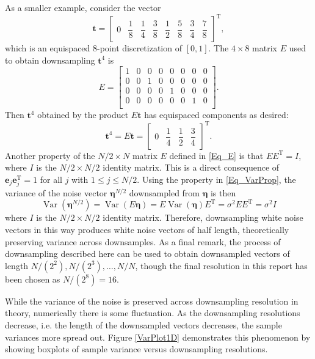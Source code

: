 \documentclass[12pt]{article}
\newcommand{\tdis}{\mathbf{t}}
\newcommand{\trans}{\mathrm{T}}	%
\newcommand{\noiseSD}{\sigma}	%
\newcommand{\noise}{\bm{\eta}}	%
\newcommand{\Var}{\operatorname{Var}}	%
\begin{document}
As a smaller example, consider the vector
\[\tdis = \begin{bmatrix}
0 & \dfrac{1}{8} & \dfrac{1}{4} & \dfrac{3}{8} & \dfrac{1}{2} & \dfrac{5}{8} & \dfrac{3}{4} & \dfrac{7}{8}
\end{bmatrix}^{\trans},\]
which is an equispaced 8-point discretization of $[0,1]$. The $4 \times 8$ matrix $E$ used to obtain downsampling $\tdis^{4}$ is
\[E = \begin{bmatrix}
1 & 0 & 0 & 0 & 0 & 0 & 0 & 0 \\
0 & 0 & 1 & 0 & 0 & 0 & 0 & 0 \\
0 & 0 & 0 & 0 & 1 & 0 & 0 & 0 \\
0 & 0 & 0 & 0 & 0 & 0 & 1 & 0 \\
\end{bmatrix}.\]
Then $\tdis^4$ obtained by the product $E\tdis$ has equispaced components as desired:
\[\tdis^4 = E\tdis = \begin{bmatrix}
0 & \dfrac{1}{4} & \dfrac{1}{2} & \dfrac{3}{4}
\end{bmatrix}^{\trans}.\]
\indent Another property of the $N/2 \times N$ matrix $E$ defined in \eqref{Eq_E} is that $EE^{\trans} = I$, where $I$ is the $N/2 \times N/2$ identity matrix.  This is a direct consequence of $\mathbf{e}_j\mathbf{e}_j^\trans = 1$ for all $j$ with $1 \leq j \leq N/2$. Using the property in \eqref{Eq_VarProp}, the variance of the  noise vector $\noise^{N/2}$ downsampled from $\noise$ is then
\[\Var(\noise^{N/2}) = \Var(E\noise) = E\Var(\noise)E^{\trans} = \noiseSD^2EE^{\trans} = \noiseSD^2I\]
where $I$ is the $N/2 \times N/2$ identity matrix. Therefore, downsampling white noise vectors in this way produces white noise vectors of half length, theoretically preserving variance across downsamples. As a final remark, the process of downsampling described here can be used to obtain downsampled vectors of length $N/(2^2), N/(2^3), \ldots, N/N$, though the final resolution in this report has been chosen as $N/(2^8) = 16$. \par 
While the variance of the noise is preserved across downsampling resolution in theory, numerically there is some fluctuation. As the downsampling resolutions decrease, i.e. the length of the downsampled vectors decreases, the sample variances more spread out. Figure \ref{VarPlot1D} demonstrates this phenomenon by showing boxplots of sample variance versus downsampling resolutions. 
\end{document}
